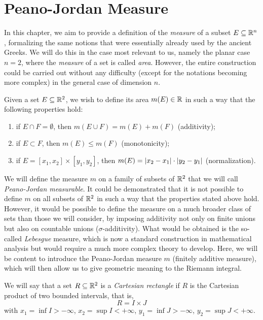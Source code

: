 \section{Peano-Jordan Measure}

In this chapter, we aim to provide a definition of the \emph{measure} of a
subset $E\subseteq {\mathbb R}^n$, formalizing the same notions that were essentially
already used by the ancient Greeks. We will do this in the case most relevant to
us, namely the planar case $n=2$, where the \emph{measure} of a set is called
\emph{area}. However, the entire construction could be carried out without any
difficulty (except for the notations becoming more complex) in the general case
of dimension $n$.

Given a set $E\subseteq {\mathbb R}^2$, we wish to define its area $m(E)\in {\mathbb R}$ in such a
way that the following properties hold:
\begin{enumerate}
  \item if $E\cap F=\emptyset$, then $m(E\cup F) = m(E) + m(F)$ (additivity);
  \item if $E \subset F$, then $m(E) \le m(F)$ (monotonicity);
  \item if $E=[x_1,x_2]\times [y_1,y_2]$, then $m(E) = {\left|x_2-x_1\right|}\cdot {\left|y_2-y_1\right|}$ (normalization).
\end{enumerate}

We will define the measure $m$ on a family of subsets of ${\mathbb R}^2$ that we will
call \emph{Peano-Jordan measurable}. It could be demonstrated that it is not
possible to define $m$ on all subsets of ${\mathbb R}^2$ in such a way that the
properties stated above hold. However, it would be possible to define the
measure on a much broader class of sets than those we will consider, by imposing
additivity not only on finite unions but also on countable unions
($\sigma$-additivity). What would be obtained is the so-called \emph{Lebesgue}
measure, which is now a standard construction in mathematical analysis but would
require a much more complex theory to develop. Here, we will be content to
introduce the Peano-Jordan measure $m$ (finitely additive measure), which will
then allow us to give geometric meaning to the Riemann integral.
%
%
%

We will say that a set $R\subseteq {\mathbb R}^2$ is a \emph{Cartesian rectangle}%
%
if $R$ is the Cartesian product of two bounded intervals, that is,
\[
  R = I\times J
\]
with $x_1=\inf I>-\infty$,
$x_2=\sup I<+\infty$,
$y_1=\inf J > -\infty$,
$y_2=\sup J < +\infty$.

